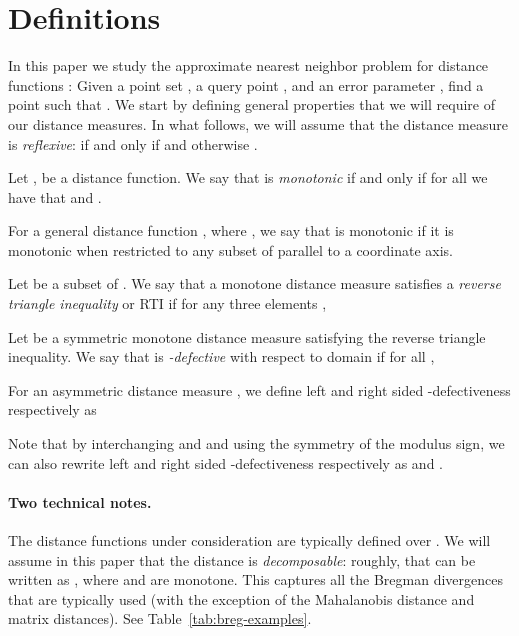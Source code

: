 \documentclass[11pt]{myclass}
\begin{document}
 
\section{Definitions}
\label{sec:defn}


In this paper we study the approximate nearest neighbor problem for distance functions :  Given a point set , a query point , and an error parameter , find a point  such that . 
We start by defining general properties that we will require of our distance measures. In what follows, we will assume that the distance measure  is \emph{reflexive}:  if and only if  and otherwise . 

\begin{defn}[Monotonicity]\label{monotonedefn}
Let ,  be a distance function. We say that  is \emph{monotonic} if and only if for all 
we have that  and .
\end{defn}


For a general distance function , where , we say that  is monotonic if it is monotonic when restricted to any subset of  parallel to a coordinate axis. 

\begin{defn}
Let  be a subset of .  We say that a monotone distance measure  satisfies a \emph{reverse triangle inequality} or RTI if for any three elements , 

\end{defn}

\begin{defn}[-defectiveness] \label{musimdefn}
Let  be a symmetric monotone distance measure satisfying the reverse triangle inequality. We say that 
 is \emph{-defective} with respect to domain  if for all ,


For an asymmetric distance measure , we define left and right sided -defectiveness respectively as 





Note that by interchanging  and  and using the symmetry of the modulus sign, we can also rewrite left and right sided 
-defectiveness respectively as   and .
\end{defn}

\paragraph{Two technical notes.} The distance functions under consideration are typically defined over . We will assume in this paper that the distance  is \emph{decomposable}: roughly, that  can be written as , where  and  are monotone. This captures all the Bregman divergences that are typically used (with the exception of the Mahalanobis distance and matrix distances). See Table~\ref{tab:breg-examples}.
\end{document}
